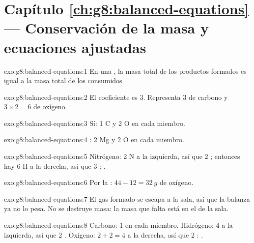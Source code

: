 \section*{Capítulo \ref{ch:g8:balanced-equations} --- Conservación de la masa y ecuaciones ajustadas}

\begin{solution}{exo:g8:balanced-equations:1}
En una , la masa total de los productos formados es
igual a la masa total de los  consumidos.
\end{solution}

\begin{solution}{exo:g8:balanced-equations:2}
El coeficiente es 3. Representa 3  de carbono y $3 \times 2 = 6$
 de oxígeno.
\end{solution}

\begin{solution}{exo:g8:balanced-equations:3}
Sí: 1 C y 2 O en cada miembro.
\end{solution}

\begin{solution}{exo:g8:balanced-equations:4}
: 2 Mg y 2 O en cada miembro.
\end{solution}

\begin{solution}{exo:g8:balanced-equations:5}
Nitrógeno: 2 N a la izquierda, así que 2 ; entonces hay 6 H a
la derecha, así que 3
: .
\end{solution}

\begin{solution}{exo:g8:balanced-equations:6}
Por la : $44 - 12 = \qty{32}{g}$ de oxígeno.
\end{solution}

\begin{solution}{exo:g8:balanced-equations:7}
El gas formado se escapa a la sala, así que la balanza ya no lo pesa.
No se destruye masa: la masa que falta está en el  de la sala.
\end{solution}

\begin{solution}{exo:g8:balanced-equations:8}
Carbono: 1 en cada miembro. Hidrógeno: 4 a la izquierda, así que 2
. Oxígeno: $2 + 2 = 4$ a la derecha, así que 2 :
.
\end{solution}

